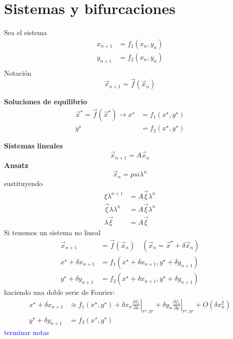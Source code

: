 \section{Sistemas y bifurcaciones}
Sea el sistema
\begin{align*}
  x_{n+1} &= f_1(x_n,y_n) \\
	y_{n+1} &= f_2(x_n,y_n) \\
\end{align*}
Notación
\begin{equation*}
  \vec{x}_{n+1} = \vec{f}(\vec{x}_{n}) 
\end{equation*}

\textbf{Soluciones de equilibrio}
\begin{align*}
	\vec{x}^{\star} = \vec{f}(\vec{x}^{\star}) \to x^{\star}&=f_1(x^{\star},y^{\star}) \\ y^{\star}&= f_2(x^{\star},y^{\star})
\end{align*}

\textbf{Sistemas lineales}
\begin{equation*}
  \vec{x}_{n+1}=A\vec{x}_n 
\end{equation*}
\textbf{Ansatz}
\begin{equation*}
  \vec{x}_n=psi \lambda^n
\end{equation*}
sustituyendo
\begin{align*}
  \xi\lambda^{n+1} &= A\vec{\xi}\lambda^{n} \\
	\vec{\xi}\lambda \lambda^{n} &= A \vec{\xi}\lambda^{n} \\
	\lambda\vec{\xi}&= A \vec{\xi}
\end{align*}
Si tenemos un sistema no lineal
\begin{align*}
  \vec{x}_{n+1} &= \vec{f}(\vec{x}_n) \quad (\vec{x}_n=\vec{x}^{\star}+ \delta \vec{x}_n )\\
	x^{\star}+\delta x_{n+1} &= f_1(x^{\star}+\delta x_{n+1}, y^{\star}+ \delta y_{n+1})\\
	y^{\star}+\delta y_{n+1} &= f_2(x^{\star}+\delta x_{n+1}, y^{\star}+ \delta y_{n+1})
\end{align*}
haciendo una doble serie de Fourier:
\begin{align*}
  x^{\star}+\delta x_{n+1} &\approx f_1(x^{\star},y^{\star})+\delta x_n \left. \frac{\partial f_1}{\partial x}  \right|_{x^{\star},y^{\star}} + \delta y_n \left. \frac{\partial f_1}{\partial y}  \right|_{x^{\star},y^{\star}} + O(\delta x_{n}^2) \\
			y^{\star} + \delta y_{n+1} &= f_2(x^{\star},y^{\star})  
\end{align*}
\textcolor{blue}{terminar notas}

